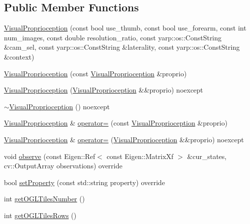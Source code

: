 \subsection*{Public Member Functions}
\begin{DoxyCompactItemize}
\item 
\hyperlink{classVisualProprioception_a46f58af24667f43811e214023ec00dcb}{Visual\+Proprioception} (const bool use\+\_\+thumb, const bool use\+\_\+forearm, const int num\+\_\+images, const double resolution\+\_\+ratio, const yarp\+::os\+::\+Const\+String \&cam\+\_\+sel, const yarp\+::os\+::\+Const\+String \&laterality, const yarp\+::os\+::\+Const\+String \&context)
\item 
\hyperlink{classVisualProprioception_a25b2467569d795d63f806ffcdb9c2be4}{Visual\+Proprioception} (const \hyperlink{classVisualProprioception}{Visual\+Proprioception} \&proprio)
\item 
\hyperlink{classVisualProprioception_a64d833138ea6dda6e893693df8768ba9}{Visual\+Proprioception} (\hyperlink{classVisualProprioception}{Visual\+Proprioception} \&\&proprio) noexcept
\item 
\hyperlink{classVisualProprioception_a7c108406fb3ab7e381b15f8e06325513}{$\sim$\+Visual\+Proprioception} () noexcept
\item 
\hyperlink{classVisualProprioception}{Visual\+Proprioception} \& \hyperlink{classVisualProprioception_a86f418db34161e128fabf2572ef4e880}{operator=} (const \hyperlink{classVisualProprioception}{Visual\+Proprioception} \&proprio)
\item 
\hyperlink{classVisualProprioception}{Visual\+Proprioception} \& \hyperlink{classVisualProprioception_adfec67b962ad60f2afa575e681b44f3f}{operator=} (\hyperlink{classVisualProprioception}{Visual\+Proprioception} \&\&proprio) noexcept
\item 
void \hyperlink{classVisualProprioception_a9ca620e3c2dde045da52f34a600daa47}{observe} (const Eigen\+::\+Ref$<$ const Eigen\+::\+Matrix\+Xf $>$ \&cur\+\_\+states, cv\+::\+Output\+Array observations) override
\item 
bool \hyperlink{classVisualProprioception_a59835a3e089f463855de8e228fc4fd91}{set\+Property} (const std\+::string property) override
\item 
int \hyperlink{classVisualProprioception_a0b3a18baa3f51b4c88155c87ab48759a}{get\+O\+G\+L\+Tiles\+Number} ()
\item 
int \hyperlink{classVisualProprioception_ac0f57686b122f7ab867d9715281692a2}{get\+O\+G\+L\+Tiles\+Rows} ()
\item 

\end{DoxyCompactItemize}

